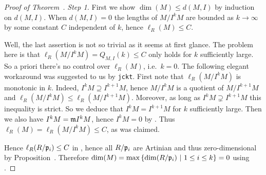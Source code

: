 \documentclass[a4paper,parskip=half,numbers=enddot, DIV=12]{scrreprt}
\begin{document}
\begin{proof}[Proof of Theorem~]
    \emph{Step 1.} First we show $\dim(M) \leq d(M,I)$ by induction on $d(M,I)$. When $d(M,I) = 0$ the lengths of $M/I^kM$ are bounded as $k\to\infty$ by some constant $C$ independent of $k$, hence $\ell_R(M) \leq C$. 
    
    Well, the last assertion is not so trivial as it seems at first glance. The problem here is that $\ell_R(M/I^kM)=Q_{M,I}(k)\leq C$ only holds for $k$ sufficiently large. So a priori there's no control over $\ell_R(M)$, i.e.\ $k=0$. The following elegant workaround was suggested to us by \texttt{jckt}. First note that $\ell_R(M/I^kM)$ is monotonic in $k$. Indeed, $I^kM\supseteq I^{k+1}M$, hence $M/I^kM$ is a quotient of $M/I^{k+1}M$ and $\ell_R(M/I^kM)\leq \ell_R(M/I^{k+1}M)$. Moreover, as long as $I^kM\supsetneq I^{k+1}M$ this inequality is strict. So we deduce that $I^kM=I^{k+1}M$ for $k$ sufficiently large. Then we also have $I^kM=\mathfrak{m} I^kM$, hence $I^kM=0$ by \NAK. Thus $\ell_R(M)=\ell_R(M/I^kM)\leq C$, as was claimed.
    
    
     Hence $\ell_R(R/\mathfrak{p}_i) \leq C$ in , hence all $R/\mathfrak{p}_i$ are Artinian and thus zero-dimensional by Proposition~. Therefore $\dim(M) = \max\left\{\dim(R/\mathfrak{p}_i)\ \middle|\  1\leq i\leq k\right\} = 0$ using . 
     

\end{proof}
\end{document}
